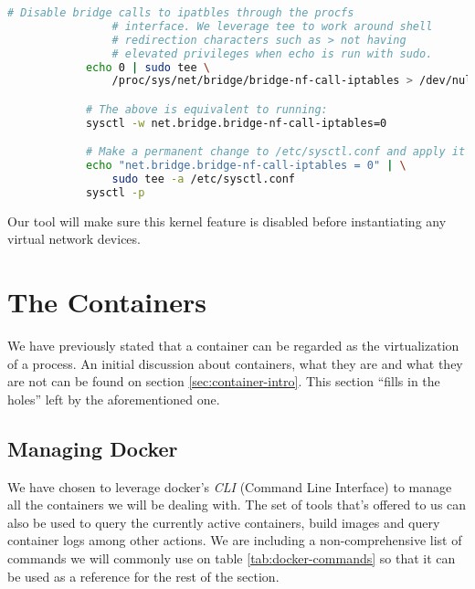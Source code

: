         \begin{lstlisting}[language = bash, caption = Disabling Bridge Calls to \textit{iptables}., label = lst:disable-brd-iptables]
            # Disable bridge calls to ipatbles through the procfs
                # interface. We leverage tee to work around shell
                # redirection characters such as > not having
                # elevated privileges when echo is run with sudo.
            echo 0 | sudo tee \
                /proc/sys/net/bridge/bridge-nf-call-iptables > /dev/null

            # The above is equivalent to running:
            sysctl -w net.bridge.bridge-nf-call-iptables=0

            # Make a permanent change to /etc/sysctl.conf and apply it
            echo "net.bridge.bridge-nf-call-iptables = 0" | \
                sudo tee -a /etc/sysctl.conf
            sysctl -p
        \end{lstlisting}

        Our tool will make sure this kernel feature is disabled before instantiating any virtual network devices.\\

    \section{The Containers} \label{sec:container-techy}
        We have previously stated that a container can be regarded as the virtualization of a process. An initial discussion about containers, what they are and what they are not can be found on section \ref{sec:container-intro}. This section ``fills in the holes'' left by the aforementioned one.\\

        \subsection{Managing Docker}
            We have chosen to leverage docker's \textit{CLI} (Command Line Interface) to manage all the containers we will be dealing with. The set of tools that's offered to us can also be used to query the currently active containers, build images and query container logs among other actions. We are including a non-comprehensive list of commands we will commonly use on table \ref{tab:docker-commands} so that it can be used as a reference for the rest of the section.\\

